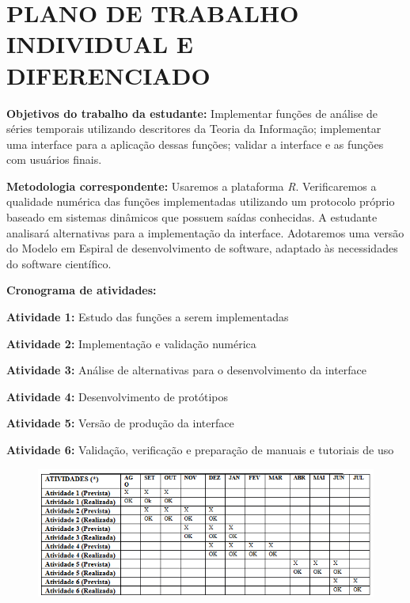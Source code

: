 \documentclass[12pt,letterpaper]{article}
\begin{document}




\newpage

\section*{\centering \textbf{PLANO DE TRABALHO INDIVIDUAL E DIFERENCIADO}} %

\textbf{Objetivos do trabalho da estudante:} Implementar funções de análise de séries temporais utilizando descritores da Teoria da Informação; implementar uma interface para a aplicação dessas funções; validar a interface e as funções com usuários finais.

\textbf{Metodologia correspondente:} Usaremos a plataforma \textit{R}. Verificaremos a qualidade numérica das funções implementadas utilizando um protocolo próprio baseado em sistemas dinâmicos que possuem saídas conhecidas. A estudante analisará alternativas para a implementação da interface. Adotaremos uma versão do Modelo em Espiral de desenvolvimento de software, adaptado às necessidades do software científico.

\textbf{Cronograma de atividades:}

\textbf{Atividade 1:} Estudo das funções a serem implementadas

\textbf{Atividade 2:} Implementação e validação numérica

\textbf{Atividade 3:} Análise de alternativas para o desenvolvimento da interface

\textbf{Atividade 4:} Desenvolvimento de protótipos

\textbf{Atividade 5:} Versão de produção da interface

\textbf{Atividade 6:} Validação, verificação e preparação de manuais e tutoriais de uso


\begin{figure}[!ht]
	\begin{center}
		\includegraphics[width=0.95\columnwidth]{tabela}
	\end{center}
\end{figure}
\end{document}
